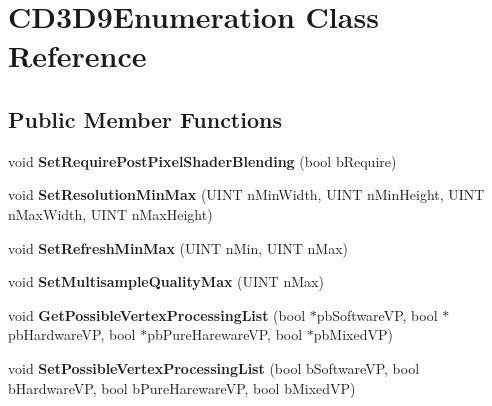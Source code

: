 \hypertarget{class_c_d3_d9_enumeration}{\section{C\+D3\+D9\+Enumeration Class Reference}
\label{class_c_d3_d9_enumeration}
}
\subsection*{Public Member Functions}
\begin{DoxyCompactItemize}
\item 
\hypertarget{class_c_d3_d9_enumeration_a6d30672fffaebff937afd2c2b35e7340}{void {\bfseries Set\+Require\+Post\+Pixel\+Shader\+Blending} (bool b\+Require)}\label{class_c_d3_d9_enumeration_a6d30672fffaebff937afd2c2b35e7340}

\item 
\hypertarget{class_c_d3_d9_enumeration_a62b409c9051bfbb9a9858b0c0a2908d0}{void {\bfseries Set\+Resolution\+Min\+Max} (U\+I\+N\+T n\+Min\+Width, U\+I\+N\+T n\+Min\+Height, U\+I\+N\+T n\+Max\+Width, U\+I\+N\+T n\+Max\+Height)}\label{class_c_d3_d9_enumeration_a62b409c9051bfbb9a9858b0c0a2908d0}

\item 
\hypertarget{class_c_d3_d9_enumeration_a4dfafc815affc2b422001bcc544769c7}{void {\bfseries Set\+Refresh\+Min\+Max} (U\+I\+N\+T n\+Min, U\+I\+N\+T n\+Max)}\label{class_c_d3_d9_enumeration_a4dfafc815affc2b422001bcc544769c7}

\item 
\hypertarget{class_c_d3_d9_enumeration_a85b5bdaebf75e44f0135fe45e0beaee5}{void {\bfseries Set\+Multisample\+Quality\+Max} (U\+I\+N\+T n\+Max)}\label{class_c_d3_d9_enumeration_a85b5bdaebf75e44f0135fe45e0beaee5}

\item 
\hypertarget{class_c_d3_d9_enumeration_aa423907a11d5e4cbe38cdefb5990b7bc}{void {\bfseries Get\+Possible\+Vertex\+Processing\+List} (bool $\ast$pb\+Software\+V\+P, bool $\ast$pb\+Hardware\+V\+P, bool $\ast$pb\+Pure\+Hareware\+V\+P, bool $\ast$pb\+Mixed\+V\+P)}\label{class_c_d3_d9_enumeration_aa423907a11d5e4cbe38cdefb5990b7bc}

\item 
\hypertarget{class_c_d3_d9_enumeration_acd0f04710c7a0938358526894bf94f4b}{void {\bfseries Set\+Possible\+Vertex\+Processing\+List} (bool b\+Software\+V\+P, bool b\+Hardware\+V\+P, bool b\+Pure\+Hareware\+V\+P, bool b\+Mixed\+V\+P)}\label{class_c_d3_d9_enumeration_acd0f04710c7a0938358526894bf94f4b}


\end{DoxyCompactItemize}
